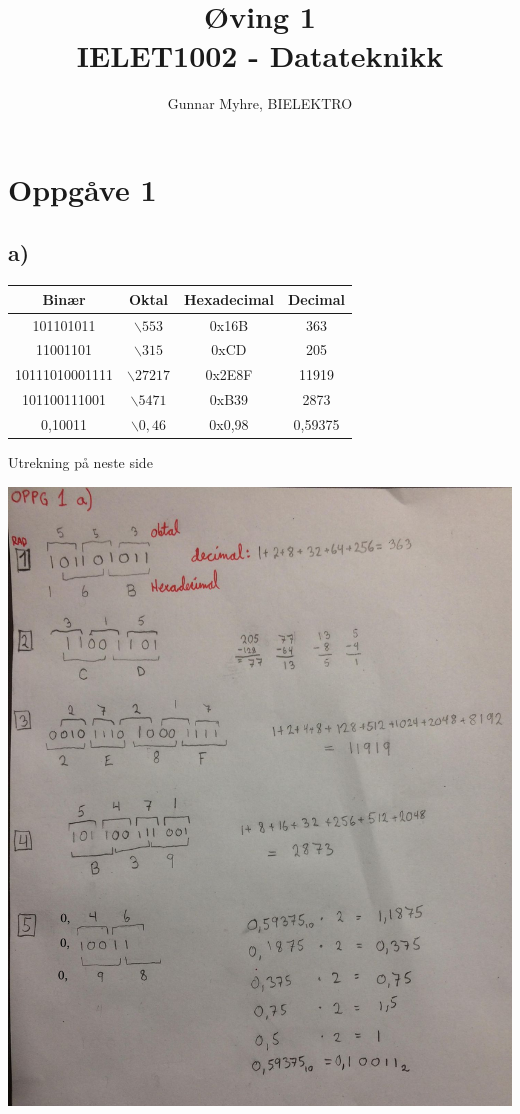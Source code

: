 \documentclass[12pt,a4paper]{article}
\title{%
  Øving 1 \\
  \large IELET1002 - Datateknikk \\
  }
\author{Gunnar Myhre, BIELEKTRO}
\begin{document}
  \maketitle
  \section{Oppgåve 1}
    \subsection{a)}
      \begin{center}
        \begin{tabular}{ |c|c|c|c| }
          \hline
          Binær & Oktal & Hexadecimal & Decimal \\
          \hline
          101101011 & $\backslash553$ & 0x16B & 363 \\
          \hline
          11001101  & $\backslash315$ & 0xCD  & 205 \\
          \hline
          10111010001111  & $\backslash27217$ & 0x2E8F  & 11919 \\
          \hline
          101100111001  & $\backslash5471$  & 0xB39 & 2873 \\
          \hline
          0,10011 & $\backslash0,46$  & 0x0,98  & 0,59375 \\
          \hline
        \end{tabular}
      \end{center}

      Utrekning på neste side

      \includegraphics[width=\textwidth]{01_1_a}
      \newpage
\end{document}
